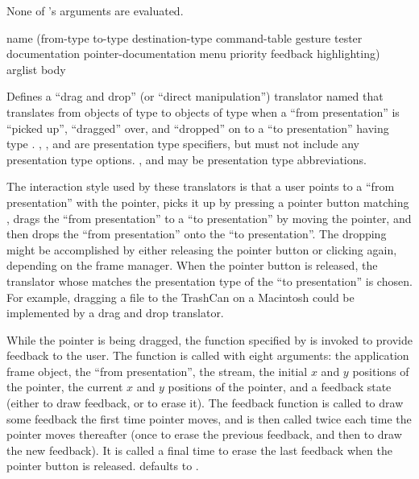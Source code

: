 None of 's arguments are evaluated.


 {name
                                             (from-type to-type destination-type command-table
                                              \key gesture tester
                                                   documentation pointer-documentation
                                                   menu priority
                                                   feedback highlighting)
                                             arglist
                                             \body body}

Defines a ``drag and drop'' (or ``direct manipulation'') translator named
 that translates from objects of type  to objects of
type  when a ``from presentation'' is ``picked up'', ``dragged''
over, and ``dropped'' on to a ``to presentation'' having type
.  , , and
 are presentation type specifiers, but must not include
any presentation type options.  ,  and
 may be presentation type abbreviations.

The interaction style used by these translators is that a user points to a
``from presentation'' with the pointer, picks it up by pressing a pointer button
matching , drags the ``from presentation'' to a ``to presentation''
by moving the pointer, and then drops the ``from presentation'' onto the ``to
presentation''.  The dropping might be accomplished by either releasing the
pointer button or clicking again, depending on the frame manager.  When the
pointer button is released, the translator whose  matches
the presentation type of the ``to presentation'' is chosen.  For example,
dragging a file to the TrashCan on a Macintosh could be implemented by a drag
and drop translator.

While the pointer is being dragged, the function specified by  is
invoked to provide feedback to the user.  The function is called with eight
arguments: the application frame object, the ``from presentation'', the stream,
the initial $x$ and $y$ positions of the pointer, the current $x$ and $y$
positions of the pointer, and a feedback state (either  to draw
feedback, or  to erase it).  The feedback function is called to
draw some feedback the first time pointer moves, and is then called twice each
time the pointer moves thereafter (once to erase the previous feedback, and then
to draw the new feedback).  It is called a final time to erase the last feedback
when the pointer button is released.   defaults to
.

